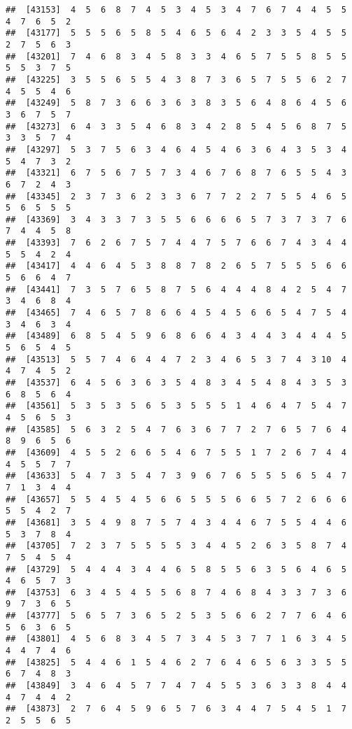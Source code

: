 \documentclass[
]{book}
\begin{document}
\begin{verbatim}
##  [43153]  4  5  6  8  7  4  5  3  4  5  3  4  7  6  7  4  4  5  5  4  7  6  5  2
##  [43177]  5  5  5  6  5  8  5  4  6  5  6  4  2  3  3  5  4  5  5  2  7  5  6  3
##  [43201]  7  4  6  8  3  4  5  8  3  3  4  6  5  7  5  5  8  5  5  5  5  3  7  5
##  [43225]  3  5  5  6  5  5  4  3  8  7  3  6  5  7  5  5  6  2  7  4  5  5  4  6
##  [43249]  5  8  7  3  6  6  3  6  3  8  3  5  6  4  8  6  4  5  6  3  6  7  5  7
##  [43273]  6  4  3  3  5  4  6  8  3  4  2  8  5  4  5  6  8  7  5  3  3  5  7  4
##  [43297]  5  3  7  5  6  3  4  6  4  5  4  6  3  6  4  3  5  3  4  5  4  7  3  2
##  [43321]  6  7  5  6  7  5  7  3  4  6  7  6  8  7  6  5  5  4  3  6  7  2  4  3
##  [43345]  2  3  7  3  6  2  3  3  6  7  7  2  2  7  5  5  4  6  5  5  6  5  5  5
##  [43369]  3  4  3  3  7  3  5  5  6  6  6  6  5  7  3  7  3  7  6  7  4  4  5  8
##  [43393]  7  6  2  6  7  5  7  4  4  7  5  7  6  6  7  4  3  4  4  5  5  4  2  4
##  [43417]  4  4  6  4  5  3  8  8  7  8  2  6  5  7  5  5  5  6  6  5  6  6  4  7
##  [43441]  7  3  5  7  6  5  8  7  5  6  4  4  4  8  4  2  5  4  7  3  4  6  8  4
##  [43465]  7  4  6  5  7  8  6  6  4  5  4  5  6  6  5  4  7  5  4  3  4  6  3  4
##  [43489]  6  8  5  4  5  9  6  8  6  6  4  3  4  4  3  4  4  4  5  5  6  5  4  5
##  [43513]  5  5  7  4  6  4  4  7  2  3  4  6  5  3  7  4  3 10  4  4  7  4  5  2
##  [43537]  6  4  5  6  3  6  3  5  4  8  3  4  5  4  8  4  3  5  3  6  8  5  6  4
##  [43561]  5  3  5  3  5  6  5  3  5  5  5  1  4  6  4  7  5  4  7  4  5  6  5  3
##  [43585]  5  6  3  2  5  4  7  6  3  6  7  7  2  7  6  5  7  6  4  8  9  6  5  6
##  [43609]  4  5  5  2  6  6  5  4  6  7  5  5  1  7  2  6  7  4  4  4  5  5  7  7
##  [43633]  5  4  7  3  5  4  7  3  9  6  7  6  5  5  5  6  5  4  7  7  1  3  4  4
##  [43657]  5  5  4  5  4  5  6  6  5  5  5  6  6  5  7  2  6  6  6  5  5  4  2  7
##  [43681]  3  5  4  9  8  7  5  7  4  3  4  4  6  7  5  5  4  4  6  5  3  7  8  4
##  [43705]  7  2  3  7  5  5  5  5  3  4  4  5  2  6  3  5  8  7  4  7  5  4  5  4
##  [43729]  5  4  4  4  3  4  4  6  5  8  5  5  6  3  5  6  4  6  5  4  6  5  7  3
##  [43753]  6  3  4  5  4  5  5  6  8  7  4  6  8  4  3  3  7  3  6  9  7  3  6  5
##  [43777]  5  6  5  7  3  6  5  2  5  3  5  6  6  2  7  7  6  4  6  5  6  3  6  5
##  [43801]  4  5  6  8  3  4  5  7  3  4  5  3  7  7  1  6  3  4  5  4  4  7  4  6
##  [43825]  5  4  4  6  1  5  4  6  2  7  6  4  6  5  6  3  3  5  5  6  7  4  8  3
##  [43849]  3  4  6  4  5  7  7  4  7  4  5  5  3  6  3  3  8  4  4  4  7  4  4  2
##  [43873]  2  7  6  4  5  9  6  5  7  6  3  4  4  7  5  4  5  1  7  2  5  5  6  5

\end{verbatim}
\end{document}
